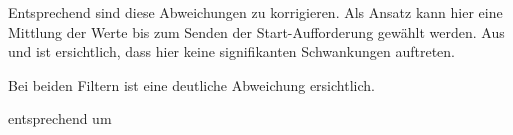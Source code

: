 Entsprechend  sind diese Abweichungen zu korrigieren.
Als Ansatz kann hier eine Mittlung der Werte bis zum Senden der Start-Aufforderung gewählt werden. Aus  und  ist ersichtlich, dass hier keine signifikanten Schwankungen auftreten. 











 Bei beiden Filtern ist eine deutliche Abweichung ersichtlich.


entsprechend  um





